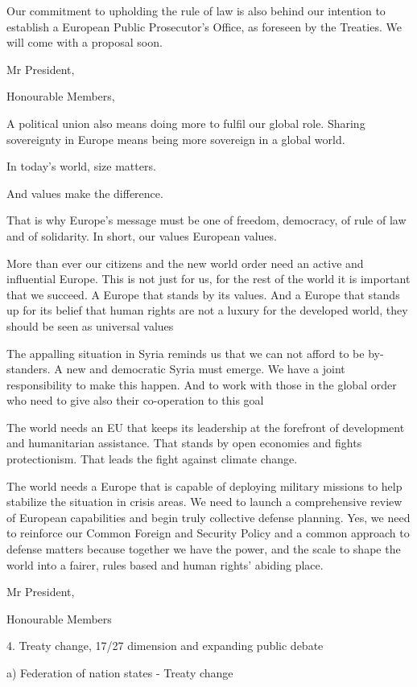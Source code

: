 \documentclass[a4paper,11pt]{article}
\begin{document}
Our commitment to upholding the rule of law is also behind our intention to establish a European Public Prosecutor's Office, as foreseen by the Treaties. We will come with a proposal soon.

Mr President,

Honourable Members,

A political union also means doing more to fulfil our global role. Sharing sovereignty in Europe means being more sovereign in a global world.

In today's world, size matters.

And values make the difference.

That is why Europe's message must be one of freedom, democracy, of rule of law and of solidarity. In short, our values European values.

More than ever our citizens and the new world order need an active and influential Europe. This is not just for us, for the rest of the world it is important that we succeed. A Europe that stands by its values. And a Europe that stands up for its belief that human rights are not a luxury for the developed world, they should be seen as universal values

The appalling situation in Syria reminds us that we can not afford to be by-standers. A new and democratic Syria must emerge. We have a joint responsibility to make this happen. And to work with those in the global order who need to give also their co-operation to this goal

The world needs an EU that keeps its leadership at the forefront of development and humanitarian assistance. That stands by open economies and fights protectionism. That leads the fight against climate change.

The world needs a Europe that is capable of deploying military missions to help stabilize the situation in crisis areas. We need to launch a comprehensive review of European capabilities and begin truly collective defense planning. Yes, we need to reinforce our Common Foreign and Security Policy and a common approach to defense matters because together we have the power, and the scale to shape the world into a fairer, rules based and human rights' abiding place.

Mr President,

Honourable Members

4. Treaty change, 17/27 dimension and expanding public debate

a) Federation of nation states - Treaty change
\end{document}
